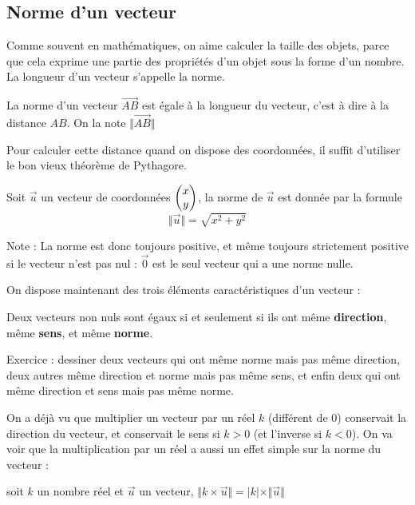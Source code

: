 \documentclass[10pt,a4paper,oneside]{book}
\begin{document}
\subsection{Norme d'un vecteur}

Comme souvent en mathématiques, on aime calculer la taille des objets, parce que cela exprime une partie des propriétés d'un objet sous la forme d'un nombre. La longueur d'un vecteur s'appelle la norme.

\begin{de}
  La norme d'un vecteur $\overrightarrow{AB}$ est égale à la longueur du vecteur, c'est à dire à la distance $AB$. On la note $\Vert \overrightarrow{AB} \Vert$
\end{de}

Pour calculer cette distance quand on dispose des coordonnées, il suffit d'utiliser le bon vieux théorème de Pythagore.

\begin{prop}
  Soit $\overrightarrow{u}$ un vecteur de coordonnées $ \begin{pmatrix} x\\ y \end{pmatrix}$, la norme de $\overrightarrow{u}$ est donnée par la formule  \[ \Vert \vec{u} \Vert = \sqrt{x^2+y^2} \]
\end{prop}

Note : La norme est donc toujours positive, et même toujours strictement positive si le vecteur n'est pas nul : $\vec{0}$ est le seul vecteur qui a une norme nulle.

On dispose maintenant des trois éléments caractéristiques d'un vecteur : 

\begin{prop}
  Deux vecteurs non nuls sont égaux si et seulement si ils ont même \textbf{direction}, même \textbf{sens}, et même \textbf{norme}.
\end{prop}

Exercice : dessiner deux vecteurs qui ont même norme mais pas même direction, deux autres même direction et norme mais pas même sens, et enfin deux qui ont même direction et sens mais pas même norme.

On a déjà vu que multiplier un vecteur par un réel $k$ (différent de $0$) conservait la direction du vecteur, et conservait le sens si $k>0$ (et l'inverse si $k<0$). On va voir que la multiplication par un réel a aussi un effet simple sur la norme du vecteur :

\begin{prop}
  soit $k$ un nombre réel et $\vec{u}$ un vecteur,  $\Vert k \times \vec{u} \Vert = |k| \times \Vert \vec{u} \Vert$ 
\end{prop}
\end{document}
